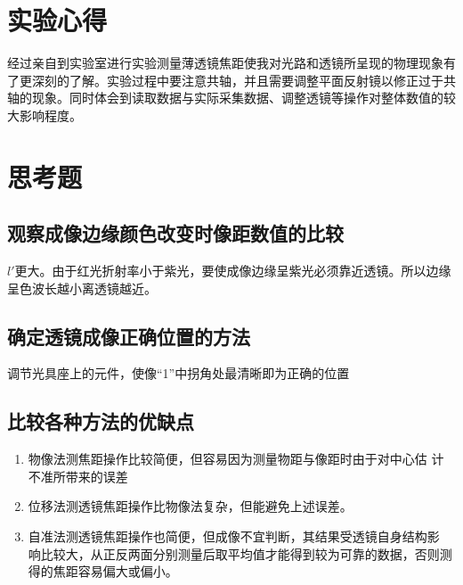 \documentclass[UTF8]{ctexart}
\begin{document}
\section{实验心得}
经过亲自到实验室进行实验测量薄透镜焦距使我对光路和透镜所呈现的物理现象有了更深刻的了解。实验过程中要注意共轴，并且需要调整平面反射镜以修正过于共轴的现象。同时体会到读取数据与实际采集数据、调整透镜等操作对整体数值的较大影响程度。
\section{思考题}

\subsection{观察成像边缘颜色改变时像距数值的比较}
$l'$更大。由于红光折射率小于紫光，要使成像边缘呈紫光必须靠近透镜。所以边缘呈色波长越小离透镜越近。

\subsection{确定透镜成像正确位置的方法}
调节光具座上的元件，使像“1”中拐角处最清晰即为正确的位置

\subsection{比较各种方法的优缺点}
\begin{enumerate}
    \item 物像法测焦距操作比较简便，但容易因为测量物距与像距时由于对中心估
计不准所带来的误差
    \item 位移法测透镜焦距操作比物像法复杂，但能避免上述误差。
    \item 自准法测透镜焦距操作也简便，但成像不宜判断，其结果受透镜自身结构影
响比较大，从正反两面分别测量后取平均值才能得到较为可靠的数据，否则测得的焦距容易偏大或偏小。
\end{enumerate}
\end{document}
